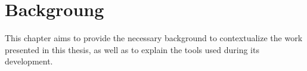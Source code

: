 \chapter{Backgroung}
\label{chap:Backgroung}

This chapter aims to provide the necessary background to contextualize the work 
presented in this thesis, as well as to explain the tools used during its development.

%







%